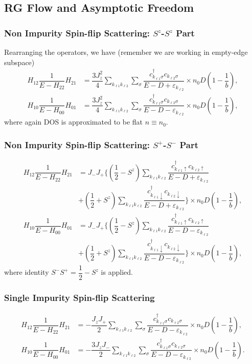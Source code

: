 \documentclass[10pt,aspectratio=43,xcolor=x11names,t]{beamer}%
\begin{document}
	\subsection{RG Flow and Asymptotic Freedom}
		\begin{frame}\frametitle{Non Impurity Spin-flip Scattering: $S^z$-$S^z$ Part}
			Rearranging the operators, we have (remember we are working in empty-edge subspace)
			\begin{align*}
				H_{12}\dfrac{1}{E-H_{22}}H_{21}&=\dfrac{3J_z^2}{4}\sum_{k_{\ell1}k_{\ell2}}\sum_\sigma \dfrac{c_{k_{\ell1}\sigma}^\dagger c_{k_{\ell2}\sigma}}{E-D+\varepsilon_{k_{\ell2}}}\times n_0D\left(1-\dfrac{1}{b}\right),\\
				H_{10}\dfrac{1}{E-H_{00}}H_{01}&=\dfrac{3J_z^2}{4}\sum_{k_{\ell1}k_{\ell2}}\sum_\sigma\dfrac{c_{k_{\ell1}\sigma}^\dagger c_{k_{\ell2}\sigma}}{E-D-\varepsilon_{k_{\ell2}}}\times n_0D\left(1-\dfrac{1}{b}\right),
			\end{align*}
			where again DOS is approximated to be flat $n\equiv n_0$.
		\end{frame}
		\begin{frame}\frametitle{Non Impurity Spin-flip Scattering: $S^+$-$S^-$ Part}
			\begin{align*}
				H_{12}\dfrac{1}{E-H_{22}}H_{21}&=J_-J_+\bigg\{\left(\dfrac{1}{2}-S^z\right)\sum_{k_{\ell1}k_{\ell2}}\dfrac{c_{k_{\ell1}\uparrow}^\dagger  c_{k_{\ell2}\uparrow}}{E-D+\varepsilon_{k_{\ell2}}}\\
				&+\left(\dfrac{1}{2}+S^z\right)\sum_{k_{\ell1}k_{\ell2}}\dfrac{c_{k_{\ell1}\downarrow}^\dagger c_{k_{\ell2}\downarrow}}{E-D+\varepsilon_{k_{\ell2}}}\bigg\}\times n_0D\left(1-\dfrac{1}{b}\right),\\
				H_{10}\dfrac{1}{E-H_{00}}H_{01}&=J_-J_+\bigg\{\left(\dfrac{1}{2}-S^z\right)\sum_{k_{\ell1}k_{\ell2}}\dfrac{c_{k_{\ell1}\uparrow}^\dagger  c_{k_{\ell2}\uparrow}}{E-D-\varepsilon_{k_{\ell2}}}\\
				&+\left(\dfrac{1}{2}+S^z\right)\sum_{k_{\ell1}k_{\ell2}}\dfrac{c_{k_{\ell1}\downarrow}^\dagger c_{k_{\ell2}\downarrow}}{E-D-\varepsilon_{k_{\ell2}}}\bigg\}\times n_0D\left(1-\dfrac{1}{b}\right),
			\end{align*}
			where identity $S^-S^+=\dfrac{1}{2}-S^z$ is applied.
		\end{frame}
		\begin{frame}\frametitle{Single Impurity Spin-flip Scattering}
			\begin{align*}
				H_{12}\dfrac{1}{E-H_{22}}H_{21}&=-\dfrac{J_z J_+}{2}\sum_{k_{\ell1}k_{\ell2}}\sum_\sigma\dfrac{c_{k_{\ell1}\sigma}^\dagger c_{k_{\ell2}\sigma}}{E-D-\varepsilon_{k_{\ell2}}}\times n_0D\left(1-\dfrac{1}{b}\right),\\
				H_{10}\dfrac{1}{E-H_{00}}H_{01}&=-\dfrac{3J_z J_-}{2}\sum_{k_{\ell1}k_{\ell2}}\sum_\sigma\dfrac{c_{k_{\ell1}\sigma}^\dagger c_{k_{\ell2}\sigma}}{E-D-\varepsilon_{k_{\ell2}}}\times n_0D\left(1-\dfrac{1}{b}\right).
			\end{align*}
		\end{frame}
\end{document}
